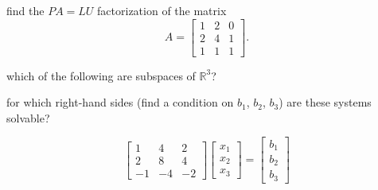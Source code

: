 \documentclass[addpoints]{exam}
\begin{document}
\begin{questions}
\question find the $PA = LU$ factorization of the matrix
\begin{equation*}
	A = \begin{bmatrix} 1 & 2 & 0 \\ 2 & 4  & 1 \\ 1 &  1 & 1 \end{bmatrix}.
\end{equation*} 

\question which of the following are subspaces of $\mathbb{R}^3$?

\question for which right-hand sides (find a condition on $b_1$, $b_2$, $b_3$) are these systems solvable?

\begin{equation*}
	\begin{bmatrix} 1 & 4 & 2 \\ 2 & 8  & 4 \\ -1 &  -4 & -2 \end{bmatrix} 
	\begin{bmatrix} x_1 \\x_2\\x_3\end{bmatrix} = \begin{bmatrix} b_1 \\b_2\\b_3\end{bmatrix}
\end{equation*} 


\end{questions}
\end{document}
